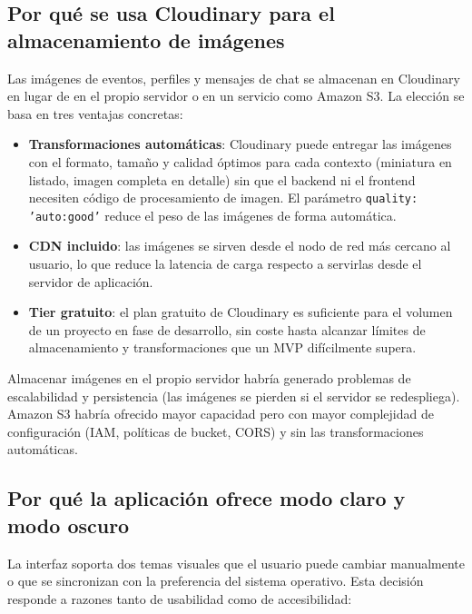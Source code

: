 \subsection{Por qué se usa Cloudinary para el almacenamiento de imágenes}

Las imágenes de eventos, perfiles y mensajes de chat se almacenan en Cloudinary en lugar de en el propio servidor o en un servicio como Amazon S3. La elección se basa en tres ventajas concretas:

\begin{itemize}
    \item \textbf{Transformaciones automáticas}: Cloudinary puede entregar las imágenes con el formato, tamaño y calidad óptimos para cada contexto (miniatura en listado, imagen completa en detalle) sin que el backend ni el frontend necesiten código de procesamiento de imagen. El parámetro \texttt{quality: 'auto:good'} reduce el peso de las imágenes de forma automática.
    \item \textbf{CDN incluido}: las imágenes se sirven desde el nodo de red más cercano al usuario, lo que reduce la latencia de carga respecto a servirlas desde el servidor de aplicación.
    \item \textbf{Tier gratuito}: el plan gratuito de Cloudinary es suficiente para el volumen de un proyecto en fase de desarrollo, sin coste hasta alcanzar límites de almacenamiento y transformaciones que un MVP difícilmente supera.
\end{itemize}

Almacenar imágenes en el propio servidor habría generado problemas de escalabilidad y persistencia (las imágenes se pierden si el servidor se redespliega). Amazon S3 habría ofrecido mayor capacidad pero con mayor complejidad de configuración (IAM, políticas de bucket, CORS) y sin las transformaciones automáticas.

\subsection{Por qué la aplicación ofrece modo claro y modo oscuro}

La interfaz soporta dos temas visuales que el usuario puede cambiar manualmente o que se sincronizan con la preferencia del sistema operativo. Esta decisión responde a razones tanto de usabilidad como de accesibilidad:

